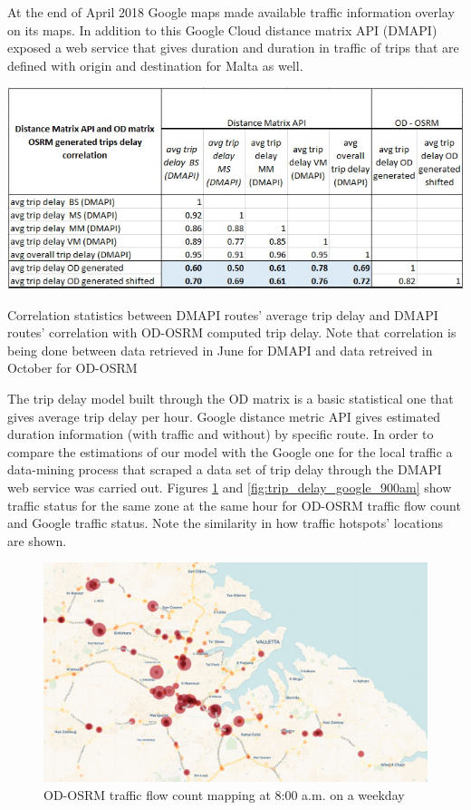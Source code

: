 \documentclass[12pt, a4paper]{report}
\theoremstyle{definition}
\theoremstyle{definition}%
\theoremstyle{definition}%
\theoremstyle{definition}%
\theoremstyle{definition}%
\theoremstyle{definition}%
\begin{document}
At the end of April 2018 Google maps made available traffic information overlay on its maps. In addition to this Google Cloud distance matrix API  (DMAPI) exposed a web service that gives duration and duration in traffic of trips that are defined with origin and destination for Malta as well.

\begin{table}[!]	
	\includegraphics[scale=0.7]{trip_delay_correlation_DMAPI_vs_MINE.jpg}
	\centering
	\caption[Trip delay correlation statistics between DMAPI and OD-OSRM]{Correlation statistics between DMAPI routes' average trip delay and DMAPI routes' correlation with OD-OSRM computed trip delay. Note that correlation is being done between data retrieved in June for DMAPI and data retreived in October for OD-OSRM}
	\label{table:trip_delay_google_vs_mine}
\end{table}


The trip delay model built through the OD matrix is a basic statistical one that gives average trip delay per hour. Google distance metric API gives estimated duration information (with traffic and without) by specific route. In order to compare the estimations of our model with the Google one for the local traffic a data-mining process that scraped a data set of trip delay through the DMAPI web service was carried out. Figures \ref{fig:trip_delay_carto_db} and  \ref{fig:trip_delay_google_900am} show traffic status for the same zone at the same hour for OD-OSRM traffic flow count and Google traffic status. Note the similarity in how traffic hotspots' locations are shown.

\begin{figure}[!]	
	\includegraphics[scale=0.4]{OD-OSRM_traffic_900am.jpg}
	\centering
	\caption[OD-OSRM traffic flow count mapping]{OD-OSRM traffic flow count mapping at 8:00 a.m. on a weekday}
	\label{fig:trip_delay_carto_db}
\end{figure}
\end{document}
